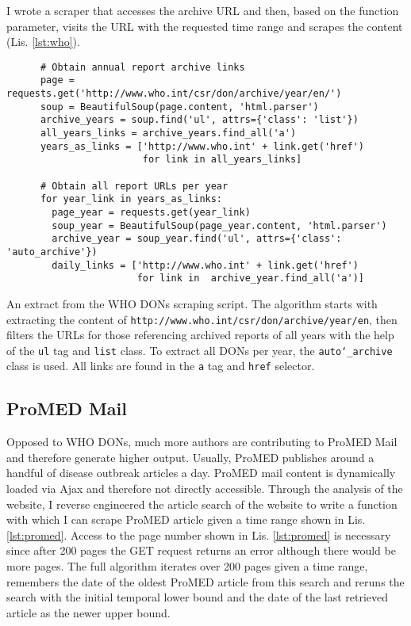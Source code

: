   I wrote a scraper that accesses the archive URL and then, based on the function parameter, visits the URL with the requested time range and scrapes the content (Lis. \ref{lst:who}).

  \begin{listing}[h]
    \begin{verbatim}
      # Obtain annual report archive links
      page = requests.get('http://www.who.int/csr/don/archive/year/en/')
      soup = BeautifulSoup(page.content, 'html.parser')
      archive_years = soup.find('ul', attrs={'class': 'list'})
      all_years_links = archive_years.find_all('a')
      years_as_links = ['http://www.who.int' + link.get('href')
                        for link in all_years_links]

      # Obtain all report URLs per year
      for year_link in years_as_links:
        page_year = requests.get(year_link)
        soup_year = BeautifulSoup(page_year.content, 'html.parser')
        archive_year = soup_year.find('ul', attrs={'class': 'auto_archive'})
        daily_links = ['http://www.who.int' + link.get('href')
                       for link in  archive_year.find_all('a')]
    \end{verbatim}
    \caption{An extract from the WHO DONs scraping script. The algorithm starts with extracting the content of \textquotesingle \texttt{http://www.who.int/csr/don/archive/year/en}\textquotesingle, then filters the URLs for those referencing archived reports of all years with the help of the \texttt{ul} tag and \texttt{list} class. To extract all DONs per year, the \texttt{auto\char`_archive} class is used. All links are found in the \texttt{a} tag and \texttt{href} selector.}
    \label{lst:who}
  \end{listing}

\subsection{ProMED Mail}
  Opposed to WHO DONs, much more authors are contributing to ProMED Mail and therefore generate higher output.
  Usually, ProMED publishes around a handful of disease outbreak articles a day.
  ProMED mail content is dynamically loaded via Ajax and therefore not directly accessible.
  Through the analysis of the website, I reverse engineered the article search of the website to write a function with which I can scrape ProMED article given a time range shown in Lis. \ref{lst:promed}.
  Access to the page number shown in Lis. \ref{lst:promed} is necessary since after 200 pages the GET request returns an error although there would be more pages.
  The full algorithm iterates over 200 pages given a time range, remembers the date of the oldest ProMED article from this search and reruns the search with the initial temporal lower bound and the date of the last retrieved article as the newer upper bound.

